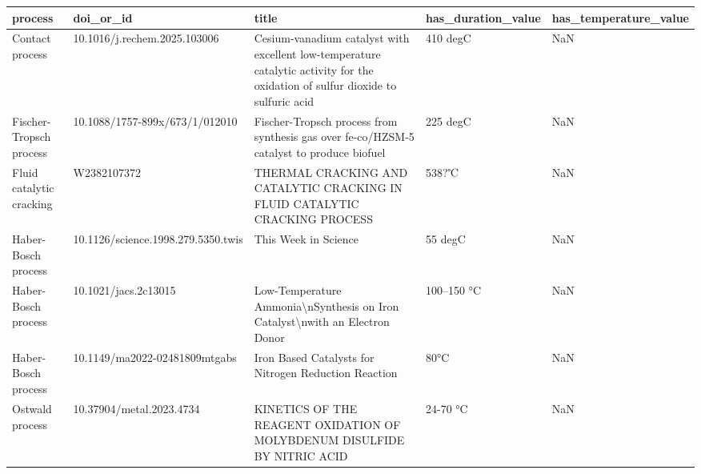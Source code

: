 \begin{tabular}{lllll}
\toprule
process & doi\_or\_id & title & has\_duration\_value & has\_temperature\_value \\
\midrule
Contact process & 10.1016/j.rechem.2025.103006 & Cesium‑vanadium catalyst with excellent low-temperature catalytic activity for the oxidation of sulfur dioxide to sulfuric acid & 410 degC & NaN \\
Fischer-Tropsch process & 10.1088/1757-899x/673/1/012010 & Fischer-Tropsch process from synthesis gas over fe-co/HZSM-5 catalyst to produce biofuel & 225 degC & NaN \\
Fluid catalytic cracking & W2382107372 & THERMAL CRACKING AND CATALYTIC CRACKING IN FLUID CATALYTIC CRACKING PROCESS & 538?℃ & NaN \\
Haber-Bosch process & 10.1126/science.1998.279.5350.twis & This Week in Science & 55 degC & NaN \\
Haber-Bosch process & 10.1021/jacs.2c13015 & Low-Temperature Ammonia\textbackslash nSynthesis on Iron Catalyst\textbackslash nwith an Electron Donor & 100–150 °C & NaN \\
Haber-Bosch process & 10.1149/ma2022-02481809mtgabs & Iron Based Catalysts for Nitrogen Reduction Reaction & 80°C & NaN \\
Ostwald process & 10.37904/metal.2023.4734 & KINETICS OF THE REAGENT OXIDATION OF MOLYBDENUM DISULFIDE BY NITRIC ACID & 24-70 °C & NaN \\
\bottomrule
\end{tabular}
